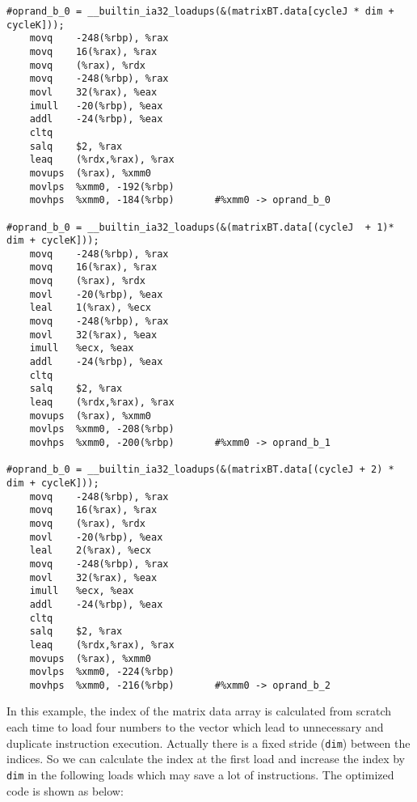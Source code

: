 \documentclass[12pt]{article}
\begin{document}
\scriptsize
\begin{verbatim}
#oprand_b_0 = __builtin_ia32_loadups(&(matrixBT.data[cycleJ * dim + cycleK]));
	movq	-248(%rbp), %rax
	movq	16(%rax), %rax
	movq	(%rax), %rdx
	movq	-248(%rbp), %rax
	movl	32(%rax), %eax
	imull	-20(%rbp), %eax
	addl	-24(%rbp), %eax
	cltq
	salq	$2, %rax
	leaq	(%rdx,%rax), %rax
	movups	(%rax), %xmm0
	movlps	%xmm0, -192(%rbp)
	movhps	%xmm0, -184(%rbp)       #%xmm0 -> oprand_b_0

#oprand_b_0 = __builtin_ia32_loadups(&(matrixBT.data[(cycleJ  + 1)* dim + cycleK]));
	movq	-248(%rbp), %rax
	movq	16(%rax), %rax
	movq	(%rax), %rdx
	movl	-20(%rbp), %eax
	leal	1(%rax), %ecx
	movq	-248(%rbp), %rax
	movl	32(%rax), %eax
	imull	%ecx, %eax
	addl	-24(%rbp), %eax
	cltq
	salq	$2, %rax
	leaq	(%rdx,%rax), %rax
	movups	(%rax), %xmm0
	movlps	%xmm0, -208(%rbp)
	movhps	%xmm0, -200(%rbp)       #%xmm0 -> oprand_b_1
	
#oprand_b_0 = __builtin_ia32_loadups(&(matrixBT.data[(cycleJ + 2) * dim + cycleK]));
	movq	-248(%rbp), %rax
	movq	16(%rax), %rax
	movq	(%rax), %rdx
	movl	-20(%rbp), %eax
	leal	2(%rax), %ecx
	movq	-248(%rbp), %rax
	movl	32(%rax), %eax
	imull	%ecx, %eax
	addl	-24(%rbp), %eax
	cltq
	salq	$2, %rax
	leaq	(%rdx,%rax), %rax
	movups	(%rax), %xmm0
	movlps	%xmm0, -224(%rbp)
	movhps	%xmm0, -216(%rbp)       #%xmm0 -> oprand_b_2
\end{verbatim}
\normalsize

In this example, the index of the matrix data array is calculated from 
scratch each time to load four numbers to the vector which lead to 
unnecessary and duplicate instruction execution. Actually there is a 
fixed stride (\texttt{dim}) between the indices. So we can calculate 
the index at the first load and increase the index by \texttt{dim} in 
the following loads which may save a lot of instructions. The optimized
code is shown as below:
\end{document}
